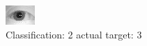 \begin{figure}[h!]
\begin{center}
\includegraphics[width=0.60\columnwidth]{figures/ID1201_class_2_target_3.png}
\end{center}
\caption{ Classification: 2 actual target: 3}
\label{fig:ID1201_class_2_target_3}
\end{figure}

